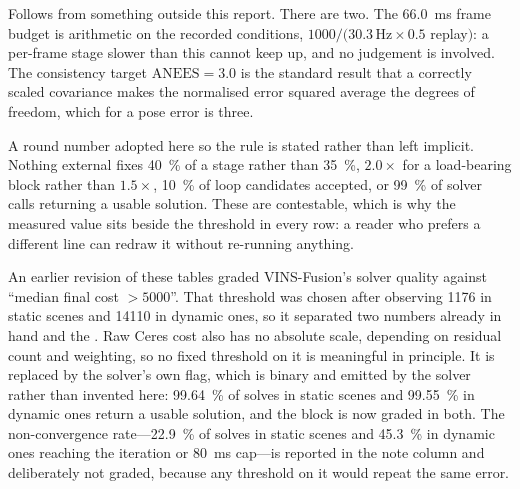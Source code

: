 \begin{description}[leftmargin=2.4em,style=nextline]
  \item[\textit{derived}] Follows from something outside this report. There are
    two. The \SI{66.0}{\milli\second} frame budget is arithmetic on the recorded
    conditions, $1000/(30.3\,\mathrm{Hz}\times0.5$ replay$)$: a per-frame stage
    slower than this cannot keep up, and no judgement is involved. The consistency
    target $\mathrm{ANEES}=3.0$ is the standard result that a correctly scaled
    covariance makes the normalised error squared average the degrees of freedom,
    which for a pose error is three.
  \item[\textit{convention}] A round number adopted here so the rule is stated
    rather than left implicit. Nothing external fixes \SI{40}{\percent} of a stage
    rather than \SI{35}{\percent}, $2.0\times$ for a load-bearing block rather than
    $1.5\times$, \SI{10}{\percent} of loop candidates accepted, or
    \SI{99}{\percent} of solver calls returning a usable solution. These are
    contestable, which is why the measured value sits beside the threshold in
    every row: a reader who prefers a different line can redraw it without
    re-running anything.
\end{description}

\begin{queried}
An earlier revision of these tables graded VINS-Fusion's solver quality against
``median final cost $>5000$''. That threshold was chosen after observing 1176 in
static scenes and 14110 in dynamic ones, so it separated two numbers already in
hand and the . Raw Ceres cost also has no absolute scale, depending on
residual count and weighting, so no fixed threshold on it is meaningful in
principle. It is replaced by the solver's own  flag,
which is binary and emitted by the solver rather than invented here:
\SI{99.64}{\percent} of solves in static scenes and \SI{99.55}{\percent} in
dynamic ones return a usable solution, and the block is now graded 
in both. The non-convergence rate---\SI{22.9}{\percent} of solves in static scenes
and \SI{45.3}{\percent} in dynamic ones reaching the iteration or
\SI{80}{\milli\second} cap---is reported in the note column and deliberately not
graded, because any threshold on it would repeat the same error.
\end{queried}

